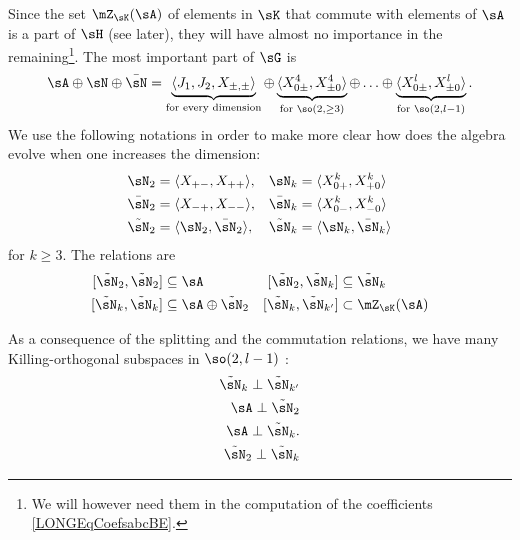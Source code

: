 Since the set $\mZ_{\sK}(\sA)$ of elements in $\sK$ that commute with elements of $\sA$ is a part of $\sH$ (see later), they will have almost no importance in the remaining\footnote{We will however need them in the computation of the coefficients \eqref{LONGEqCoefsabcBE}.}. The most important part of $\sG$ is
\begin{equation}		\label{LONGEqDecomDimQlipm}
    \sA\oplus\sN\oplus\bar\sN=\underbrace{\langle J_1,J_2,X_{\pm,\pm}\rangle}_{\text{for every dimension}}\oplus\underbrace{\langle X_{0\pm}^{4},X_{\pm 0}^{4}\rangle}_{\text{for }\so(2,\geq 3)}\oplus\ldots\oplus\underbrace{\langle X_{0\pm}^l,X_{\pm 0}^{l}\rangle}_{\text{for } \so(2, l-1)}.
\end{equation}
We use the following notations in order to make more clear how does the algebra evolve when one increases the dimension:
\begin{equation}
	\begin{aligned}[]
		\sN_2&=\langle X_{+-},X_{++}\rangle,		&\sN_k&=\langle X^k_{0+},X_{+0}^k\rangle	\\
		\bar\sN_2&=\langle X_{-+},X_{--} \rangle, 	&\bar\sN_k&=\langle X_{0-}^k,X_{-0}^k\rangle\\
		\tilde\sN_2&=\langle \sN_2,\bar\sN_2\rangle,	&\tilde\sN_k&=\langle \sN_k,\bar\sN_k\rangle
	\end{aligned}
\end{equation}
for $k\geq 3$. The relations are
\begin{equation}		\label{LONGEqsCommWithtsNDeuxkA}
	\begin{aligned}[]
		[\tilde\sN_2,\tilde\sN_2]&\subseteq\sA
		&[\tilde\sN_2,\tilde\sN_k]&\subseteq\tilde\sN_k\\
		[\tilde\sN_k,\tilde\sN_{k}]&\subseteq\sA\oplus\tilde\sN_2
		&[\tilde\sN_k,\tilde\sN_{k'}]&\subset \mZ_{\sK}(\sA) \\
	\end{aligned}
\end{equation}

As a consequence of the splitting and the commutation relations, we have many Killing-orthogonal subspaces in $\so(2,l-1)$ :
\begin{subequations}
	\begin{align}
		\tilde\sN_k\perp\tilde\sN_{k'}		\label{LONGEqtsnkperprtsnkp}	\\
		\sA\perp\tilde\sN_2			\label{LONGEqAperpNTrois}		\\
		\sA\perp\tilde\sN_k.	\label{LONGEqAperpNk}				\\
		\tilde\sN_2\perp\tilde\sN_k	\label{LONGEqNTtroisperpNk}
	\end{align}
\end{subequations}

